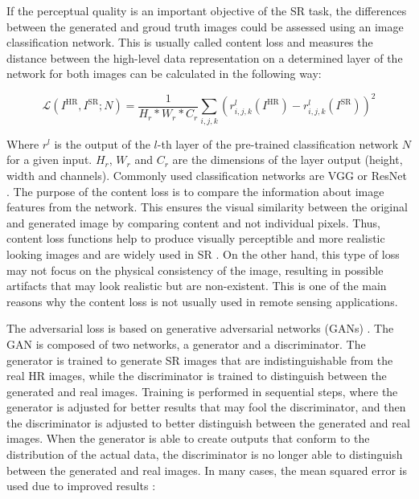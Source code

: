         If the perceptual quality is an important objective of the SR task, the differences between the generated and groud truth images could be assessed using an image classification network. This is usually called content loss and measures the distance between the high-level data representation on a determined layer of the network for both images can be calculated in the following way:

        \begin{equation}
            \mathcal{L}(I^{\text{HR}}, I^{\text{SR}}; N) = \frac{1}{H_r*W_r*C_r}\sum_{i,j,k}(r^{l}_{i,j,k}(I^{\text{HR}}) - r^{l}_{i,j,k}(I^{\text{SR}}))^2
        \end{equation}

        Where $r^{l}$ is the output of the $l$-th layer of the pre-trained classification network $N$ for a given input. $H_r$, $W_r$ and $C_r$ are the dimensions of the layer output (height, width and channels). 
        Commonly used classification networks are VGG \cite{simonyan2015deep} or ResNet \cite{he2015deep}.
        The purpose of the content loss is to compare the information about image features from the network. This ensures the visual similarity between the original and generated image by comparing content and not individual pixels. Thus, content loss functions help to produce visually perceptible and more realistic looking images and are widely used in SR \cite{ledig2017photorealistic,wang2018recovering}. On the other hand, this type of loss may not focus on the physical consistency of the image, resulting in possible artifacts that may look realistic but are non-existent. This is one of the main reasons why the content loss is not usually used in remote sensing applications.

        The adversarial loss is based on generative adversarial networks (GANs) \cite{goodfellow2014generative}. The GAN is composed of two networks, a generator and a discriminator. The generator is trained to generate SR images that are indistinguishable from the real HR images, while the discriminator is trained to distinguish between the generated and real images. 
        Training is performed in sequential steps, where the generator is adjusted for better results that may fool the discriminator, and then the discriminator is adjusted to better distinguish between the generated and real images.
        When the generator is able to create outputs that conform to the distribution of the actual data, the discriminator is no longer able to distinguish between the generated and real images. In many cases, the mean squared error is used due to improved results \cite{mao2017squares}: 

